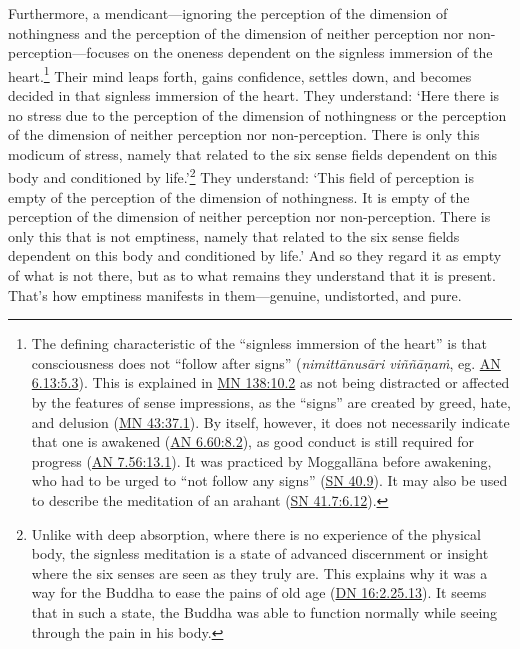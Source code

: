 \documentclass[12pt,openany]{book}%
\begin{document}
Furthermore, a mendicant—ignoring the perception of the dimension of nothingness and the perception of the dimension of neither perception nor non-perception—focuses on the oneness dependent on the signless immersion of the heart.\footnote{The defining characteristic of the “signless immersion of the heart” is that consciousness does not “follow after signs” (\textit{\textsanskrit{nimittānusāri} \textsanskrit{viññāṇaṁ}}, eg. \href{https://suttacentral.net/an6.13/en/sujato\#5.3}{AN 6.13:5.3}). This is explained in \href{https://suttacentral.net/mn138/en/sujato\#10.2}{MN 138:10.2} as not being distracted or affected by the features of sense impressions, as the “signs” are created by greed, hate, and delusion (\href{https://suttacentral.net/mn43/en/sujato\#37.1}{MN 43:37.1}). By itself, however, it does not necessarily indicate that one is awakened (\href{https://suttacentral.net/an6.60/en/sujato\#8.2}{AN 6.60:8.2}), as good conduct is still required for progress (\href{https://suttacentral.net/an7.56/en/sujato\#13.1}{AN 7.56:13.1}). It was practiced by \textsanskrit{Moggallāna} before awakening, who had to be urged to “not follow any signs” (\href{https://suttacentral.net/sn40.9/en/sujato}{SN 40.9}). It may also be used to describe the meditation of an arahant (\href{https://suttacentral.net/sn41.7/en/sujato\#6.12}{SN 41.7:6.12}). } Their mind leaps forth, gains confidence, settles down, and becomes decided in that signless immersion of the heart. They understand: ‘Here there is no stress due to the perception of the dimension of nothingness or the perception of the dimension of neither perception nor non-perception. There is only this modicum of stress, namely that related to the six sense fields dependent on this body and conditioned by life.’\footnote{Unlike with deep absorption, where there is no experience of the physical body, the signless meditation is a state of advanced discernment or insight where the six senses are seen as they truly are. This explains why it was a way for the Buddha to ease the pains of old age (\href{https://suttacentral.net/dn16/en/sujato\#2.25.13}{DN 16:2.25.13}). It seems that in such a state, the Buddha was able to function normally while seeing through the pain in his body. } They understand: ‘This field of perception is empty of the perception of the dimension of nothingness. It is empty of the perception of the dimension of neither perception nor non-perception. There is only this that is not emptiness, namely that related to the six sense fields dependent on this body and conditioned by life.’ And so they regard it as empty of what is not there, but as to what remains they understand that it is present. That’s how emptiness manifests in them—genuine, undistorted, and pure. 
\end{document}
